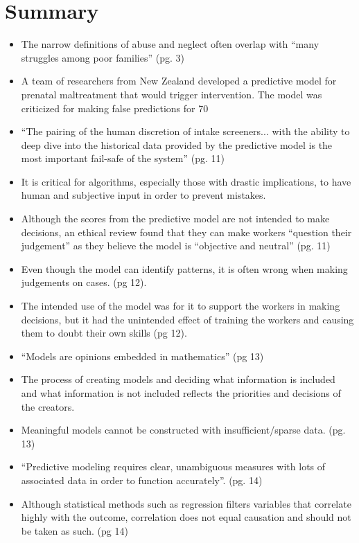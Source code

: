 \documentclass{article}
\begin{document}
\section{Summary}
    \begin{itemize}
        \item The narrow definitions of abuse and neglect often overlap with “many struggles among poor families” (pg. 3)
        \item A team of researchers from New Zealand developed a predictive model for prenatal maltreatment that would trigger intervention. The model was criticized for making false predictions for 70%
        \item “The pairing of the human discretion of intake screeners... with the ability to deep dive into the historical data provided by the predictive model is the most important fail-safe of the system” (pg. 11)
        \item It is critical for algorithms, especially those with drastic implications, to have human and subjective input in order to prevent mistakes. 
        \item Although the scores from the predictive model are not intended to make decisions, an ethical review found that they can make workers “question their judgement” as they believe the model is “objective and neutral” (pg. 11)
        \item Even though the model can identify patterns, it is often wrong when making judgements on cases. (pg 12).
        \item The intended use of the model was for it to support the workers in making decisions, but it had the unintended effect of training the workers and causing them to doubt their own skills (pg 12).
        \item “Models are opinions embedded in mathematics” (pg 13)
        \item The process of creating models and deciding what information is included and what information is not included reflects the priorities and decisions of the creators.
        \item Meaningful models cannot be constructed with insufficient/sparse data. (pg. 13)
        \item “Predictive modeling requires clear, unambiguous measures with lots of associated data in order to function accurately”. (pg. 14)
        \item Although statistical methods such as regression filters variables that correlate highly with the outcome, correlation does not equal causation and should not be taken as such. (pg 14)

\end{itemize}
\end{document}
